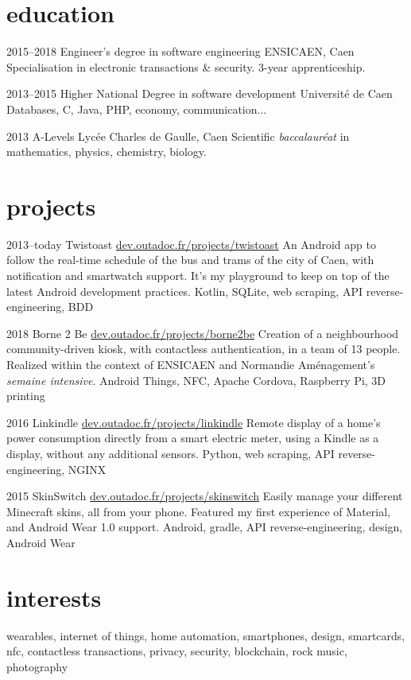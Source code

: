\documentclass[]{friggeri-cv}
\begin{document}
\section{education}

\begin{entrylist}
    \entry
    {2015--2018}
    {Engineer's degree {\normalfont in software engineering}}
    {ENSICAEN, Caen}
    {Specialisation in electronic transactions \& security. 3-year apprenticeship.}{}
    
    \entry
    {2013--2015}
    {Higher National Degree {\normalfont in software development}}
    {Université de Caen}
    {Databases, C, Java, PHP, economy, communication...}{}
    
    \entry
    {2013}
    {A-Levels}
    {Lycée Charles de Gaulle, Caen}
    {Scientific \textit{baccalauréat} in mathematics, physics, chemistry, biology.}{}
\end{entrylist}

\section{projects}

\begin{entrylist}
	\entry
	{2013--today}
	{Twistoast}
	{\href{https://dev.outadoc.fr/projects/twistoast}{dev.outadoc.fr/projects/twistoast}}
	{An Android app to follow the real-time schedule of the bus and trams of the city of Caen, with notification and smartwatch support. It's my playground to keep on top of the latest Android development practices.}
	{Kotlin, SQLite, web scraping, API reverse-engineering, BDD}
	
    \entry
    {2018}
    {Borne 2 Be}
    {\href{https://dev.outadoc.fr/projects/borne2be}{dev.outadoc.fr/projects/borne2be}}
    {Creation of a neighbourhood community-driven kiosk, with contactless authentication, in a team of 13 people. Realized within the context of ENSICAEN and Normandie Aménagement's \textit{semaine intensive}.}
    {Android Things, NFC, Apache Cordova, Raspberry Pi, 3D printing}
    
    \entry
    {2016}
    {Linkindle}
    {\href{https://dev.outadoc.fr/projects/linkindle}{dev.outadoc.fr/projects/linkindle}}
    {Remote display of a home's power consumption directly from a smart electric meter, using a Kindle as a display, without any additional sensors.}
    {Python, web scraping, API reverse-engineering, NGINX}
    
    \entry
    {2015}
    {SkinSwitch}
    {\href{https://dev.outadoc.fr/projects/skinswitch}{dev.outadoc.fr/projects/skinswitch}}
    {Easily manage your different Minecraft skins, all from your phone. Featured my first experience of Material, and Android Wear 1.0 support.}
    {Android, gradle, API reverse-engineering, design, Android Wear}
    
\end{entrylist}

\section{interests}

wearables, internet of things, home automation, smartphones, design, smartcards, nfc, contactless transactions, privacy, security, blockchain, rock music, photography
\end{document}
